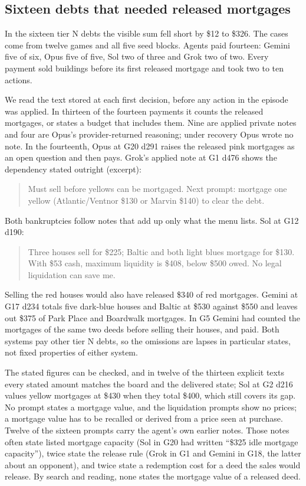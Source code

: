 \documentclass[11pt,letterpaper]{article}
\newenvironment{tq}{\begin{quote}\small}{\end{quote}}
\begin{document}
\subsection{Sixteen debts that needed released mortgages}
In the sixteen tier N debts the visible sum fell short by \$12 to \$326. The cases come from twelve games and all five seed blocks. Agents paid fourteen: Gemini five of six, Opus five of five, Sol two of three and Grok two of two. Every payment sold buildings before its first released mortgage and took two to ten actions.

We read the text stored at each first decision, before any action in the episode was applied. In thirteen of the fourteen payments it counts the released mortgages, or states a budget that includes them. Nine are applied private notes and four are Opus's provider-returned reasoning; under recovery Opus wrote no note. In the fourteenth, Opus at G20 d291 raises the released pink mortgages as an open question and then pays. Grok's applied note at G1 d476 shows the dependency stated outright (excerpt):
\begin{tq}
Must sell before yellows can be mortgaged. Next prompt: mortgage one yellow (Atlantic/Ventnor \$130 or Marvin \$140) to clear the debt.
\end{tq}
Both bankruptcies follow notes that add up only what the menu lists. Sol at G12 d190:
\begin{tq}
Three houses sell for \$225; Baltic and both light blues mortgage for \$130. With \$53 cash, maximum liquidity is \$408, below \$500 owed. No legal liquidation can save me.
\end{tq}
Selling the red houses would also have released \$340 of red mortgages. Gemini at G17 d234 totals five dark-blue houses and Baltic at \$530 against \$550 and leaves out \$375 of Park Place and Boardwalk mortgages. In G5 Gemini had counted the mortgages of the same two deeds before selling their houses, and paid. Both systems pay other tier N debts, so the omissions are lapses in particular states, not fixed properties of either system.

The stated figures can be checked, and in twelve of the thirteen explicit texts every stated amount matches the board and the delivered state; Sol at G2 d216 values yellow mortgages at \$430 when they total \$400, which still covers its gap. No prompt states a mortgage value, and the liquidation prompts show no prices; a mortgage value has to be recalled or derived from a price seen at purchase. Twelve of the sixteen prompts carry the agent's own earlier notes. Those notes often state listed mortgage capacity (Sol in G20 had written ``\$325 idle mortgage capacity''), twice state the release rule (Grok in G1 and Gemini in G18, the latter about an opponent), and twice state a redemption cost for a deed the sales would release. By search and reading, none states the mortgage value of a released deed.
\end{document}
